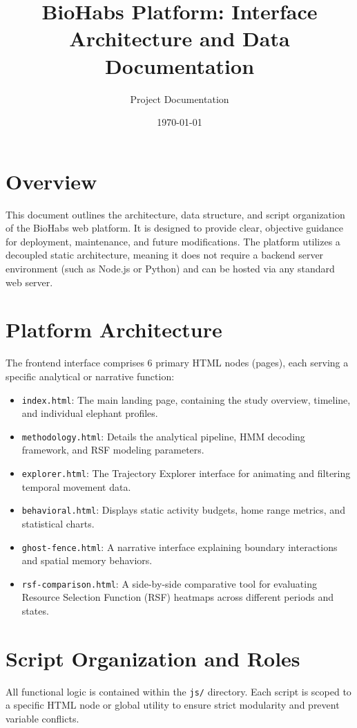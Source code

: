 \documentclass[12pt]{article}
\title{BioHabs Platform: Interface Architecture and Data Documentation}
\author{Project Documentation}
\date{\today}
\begin{document}
\maketitle

\section{Overview}
This document outlines the architecture, data structure, and script organization of the BioHabs web platform. It is designed to provide clear, objective guidance for deployment, maintenance, and future modifications. The platform utilizes a decoupled static architecture, meaning it does not require a backend server environment (such as Node.js or Python) and can be hosted via any standard web server.

\section{Platform Architecture}
The frontend interface comprises 6 primary HTML nodes (pages), each serving a specific analytical or narrative function:
\begin{itemize}
    \item \texttt{index.html}: The main landing page, containing the study overview, timeline, and individual elephant profiles.
    \item \texttt{methodology.html}: Details the analytical pipeline, HMM decoding framework, and RSF modeling parameters.
    \item \texttt{explorer.html}: The Trajectory Explorer interface for animating and filtering temporal movement data.
    \item \texttt{behavioral.html}: Displays static activity budgets, home range metrics, and statistical charts.
    \item \texttt{ghost-fence.html}: A narrative interface explaining boundary interactions and spatial memory behaviors.
    \item \texttt{rsf-comparison.html}: A side-by-side comparative tool for evaluating Resource Selection Function (RSF) heatmaps across different periods and states.
\end{itemize}

\section{Script Organization and Roles}
All functional logic is contained within the \texttt{js/} directory. Each script is scoped to a specific HTML node or global utility to ensure strict modularity and prevent variable conflicts.
\end{document}
